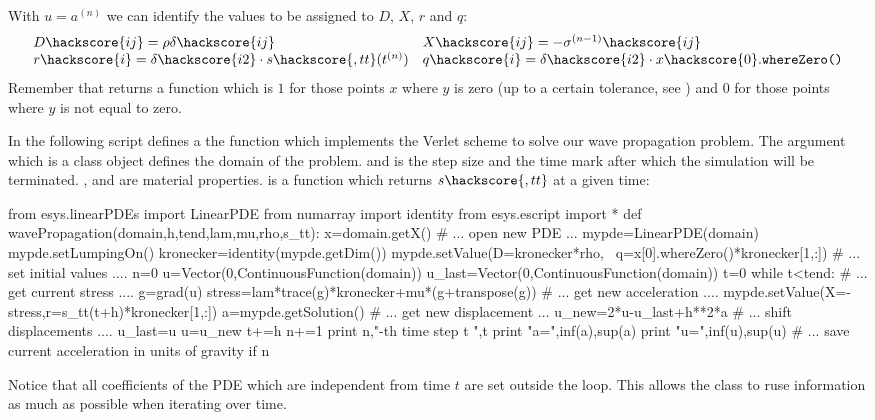 With $u=a^{(n)}$ we can identify the values to be assigned to $D$, $X$, $r$ and $q$:
\begin{equation}\label{WAVE  dyn 6}
\begin{array}{ll}
D\hackscore{ij}=\rho \delta\hackscore{ij}&
X\hackscore{ij}=-\sigma^{(n-1)}\hackscore{ij} \\
r\hackscore{i}=\delta\hackscore{i2} \cdot s\hackscore{,tt}(t^{(n)}) & q\hackscore{i}=\delta\hackscore{i2}  \cdot x\hackscore{0}.\texttt{whereZero()} 
\end{array}
\end{equation}
Remember that  returns a function which is $1$ for those points $x$ where $y$ is zero
(up to a certain tolerance, see ) and $0$ for those points where $y$ is not equal to zero.
 
In the following script defines a the function  which
implements the Verlet scheme to solve our wave propagation problem. 
The argument  which is a \Domain class object
defines the domain of the problem.  and  is the step size
and the time mark after which the simulation will be terminated. ,  and 
 are material properties.  is a function which returns $s\hackscore{,tt}$ at a given time: 
\begin{python}
from esys.linearPDEs import LinearPDE
from numarray import identity
from esys.escript import *
def wavePropagation(domain,h,tend,lam,mu,rho,s_tt):
   x=domain.getX()
   # ... open new PDE ...
   mypde=LinearPDE(domain)
   mypde.setLumpingOn()
   kronecker=identity(mypde.getDim())
   mypde.setValue(D=kronecker*rho, \
                  q=x[0].whereZero()*kronecker[1,:])
   # ... set initial values ....
   n=0
   u=Vector(0,ContinuousFunction(domain))
   u_last=Vector(0,ContinuousFunction(domain))
   t=0
   while t<tend:
     # ... get current stress ....
     g=grad(u)
     stress=lam*trace(g)*kronecker+mu*(g+transpose(g))
     # ... get new acceleration ....
     mypde.setValue(X=-stress,r=s_tt(t+h)*kronecker[1,:])
     a=mypde.getSolution()
     # ... get new displacement ...
     u_new=2*u-u_last+h**2*a
     # ... shift displacements ....
     u_last=u
     u=u_new
     t+=h
     n+=1
     print n,"-th time step t ",t
     print "a=",inf(a),sup(a)
     print "u=",inf(u),sup(u)
     # ... save current acceleration in units of gravity
     if n%
\end{python}
Notice that 
all coefficients of the PDE which are independent from time $t$ are set outside the  
loop. This allows the \LinearPDE class to ruse information as much as possible 
when iterating over time.  
 
